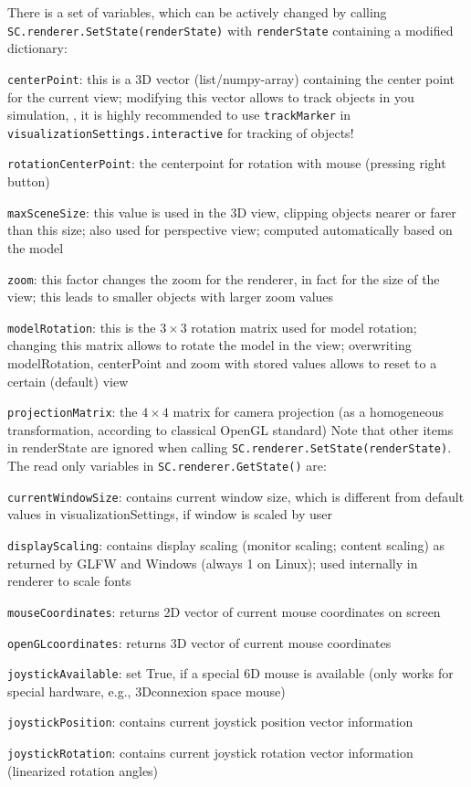 There is a set of variables, which can be actively changed by calling  \texttt{SC.renderer.SetState(renderState)} with \texttt{renderState}
containing a modified dictionary:
\bi
  \item \texttt{centerPoint}: this is a 3D vector (list/numpy-array) containing the center point for the current view; modifying this vector allows to track objects in you simulation, , it is highly recommended to use \texttt{trackMarker} in \texttt{visualizationSettings.interactive} for tracking of objects!
  \item \texttt{rotationCenterPoint}: the centerpoint for rotation with mouse (pressing right button)
  \item \texttt{maxSceneSize}: this value is used in the 3D view, clipping objects nearer or farer than this size; also used for perspective view; computed automatically based on the model
  \item \texttt{zoom}: this factor changes the zoom for the renderer, in fact for the size of the view; this leads to smaller objects with larger zoom values
  \item \texttt{modelRotation}: this is the $3 \times 3$ rotation matrix used for model rotation; changing this matrix allows to rotate the model in the view; overwriting modelRotation, centerPoint and zoom with stored values allows to reset to a certain (default) view
  \item \texttt{projectionMatrix}: the $4 \times 4$ matrix for camera projection (as a homogeneous transformation, according to classical OpenGL standard)
\ei
Note that other items in renderState are ignored when calling \texttt{SC.renderer.SetState(renderState)}. The read only variables in \texttt{SC.renderer.GetState()} are:
\bi
  \item \texttt{currentWindowSize}: contains current window size, which is different from default values in visualizationSettings, if window is scaled by user
  \item \texttt{displayScaling}: contains display scaling (monitor scaling; content scaling) as returned by GLFW and Windows (always 1 on Linux); used internally in renderer to scale fonts
  \item \texttt{mouseCoordinates}: returns 2D vector of current mouse coordinates on screen
  \item \texttt{openGLcoordinates}: returns 3D vector of current mouse coordinates
  \item \texttt{joystickAvailable}: set True, if a special 6D mouse is available (only works for special hardware, e.g., 3Dconnexion space mouse)
  \item \texttt{joystickPosition}: contains current joystick position vector information 
  \item \texttt{joystickRotation}: contains current joystick rotation vector information (linearized rotation angles)
\ei

